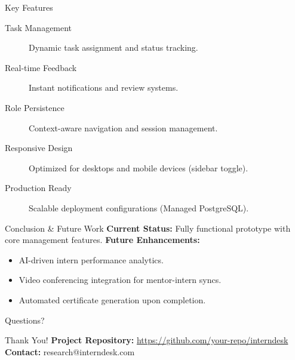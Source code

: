 \documentclass[10pt]{beamer}
\begin{document}
\begin{frame}{Key Features}
    \begin{description}
        \item[Task Management] Dynamic task assignment and status tracking.
        \item[Real-time Feedback] Instant notifications and review systems.
        \item[Role Persistence] Context-aware navigation and session management.
        \item[Responsive Design] Optimized for desktops and mobile devices (sidebar toggle).
        \item[Production Ready] Scalable deployment configurations (Managed PostgreSQL).
    \end{description}
\end{frame}

\begin{frame}{Conclusion \& Future Work}
    \textbf{Current Status:} Fully functional prototype with core management features.
    \vspace{0.5cm}
    \textbf{Future Enhancements:}
    \begin{itemize}
        \item AI-driven intern performance analytics.
        \item Video conferencing integration for mentor-intern syncs.
        \item Automated certificate generation upon completion.
    \end{itemize}
\end{frame}

\begin{frame}{Questions?}
    \begin{center}
        \Huge Thank You!
        \vspace{1cm}
        \large
        \textbf{Project Repository:} \url{https://github.com/your-repo/interndesk} \\
        \textbf{Contact:} research@interndesk.com
    \end{center}
\end{frame}
\end{document}
